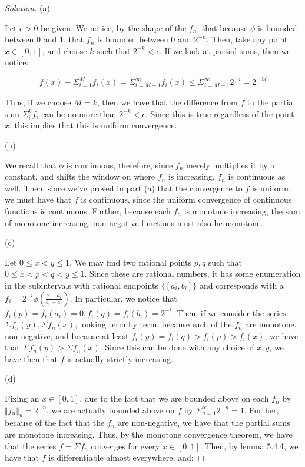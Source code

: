 \documentclass[10pt]{article}
\begin{document}
\begin{proof}[Solution]

(a)

Let $\epsilon > 0$ be given. We notice, by the shape of the $f_n$, that because $\phi$ is bounded between 0 and 1, that $f_n$ is bounded between $0$ and $2^{-n}$. Then, take any point $x \in [0,1]$, and choose $k$ such that $2^{-k} < \epsilon$. If we look at partial sums, then we notice:

$$ f(x) - \Sigma_{i=1}^M f_i(x) = \Sigma_{i=M+1}^\infty f_i(x) \leq \Sigma_{i=M+1}^\infty 2^{-i} = 2^{-M} $$

Thus, if we choose $M = k$, then we have that the difference from $f$ to the partial sum $\Sigma_i^k f_i$ can be no more than $2^{-k} < \epsilon$. Since this is true regardless of the point $x$, this implies that this is uniform convergence.

(b)

We recall that $\phi$ is continuous, therefore, since $f_n$ merely multiplies it by a constant, and shifts the window on where $f_n$ is increasing, $f_n$ is continuous as well. Then, since we've proved in part (a) that the convergence to $f$ is uniform, we must have that $f$ is continuous, since the uniform convergence of continuous functions is continuous. Further, because each $f_n$ is monotone increasing, the sum of monotone increasing, non-negative functions must also be monotone.

(c)

Let $0 \leq x < y \leq 1$. We may find two rational points $p,q$ such that $0 \leq x < p < q < y \leq 1$. Since these are rational numbers, it has some enumeration in the subintervals with rational endpoints $\{ [a_i, b_i ] \}$ and corresponds with a $f_i = 2^{-i} \phi\left( \frac{x - a_i}{b_i - a_i} \right)$. In particular, we notice that $f_i(p) = f_i(a_i) = 0, f_i(q) = f_i(b_i) = 2^{-i}$. Then, if we consider the series $\Sigma f_n(y), \Sigma f_n(x)$, looking term by term, because each of the $f_n$ are monotone, non-negative, and because at least $f_i(y) = f_i(q) > f_i(p) > f_i(x)$, we have that $\Sigma f_n(y) > \Sigma f_n(x)$. Since this can be done with any choice of $x,y$, we have then that $f$ is actually strictly increasing.

(d)

Fixing an $x \in [0,1]$, due to the fact that we are bounded above on each $f_n$ by $\Vert f_n \Vert_u = 2^{-n}$, we are actually bounded above on $f$ by $\Sigma_{n=1}^\infty 2^{-n} = 1$. Further, because of the fact that the $f_n$ are non-negative, we have that the partial sums are monotone increasing. Thus, by the monotone convergence theorem, we have that the series $f = \Sigma f_n$ converges for every $x \in [0,1]$. Then, by lemma 5.4.4, we have that $f$ is differentiable almost everywhere, and:


\end{proof}
\end{document}

